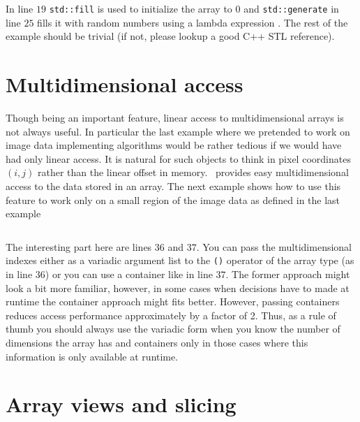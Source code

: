 \inputminted[fontsize=\small,
             linenos,
             firstline=24,
             frame=lines,
             label=examples/array\_stl.cpp]
{cpp}{../examples/array_stl.cpp}
In line $19$ \texttt{std::fill} is used to initialize the array to $0$ and 
\texttt{std::generate} in line $25$ fills it with random numbers using a lambda
expression . The rest of the example should be trivial (if not, please lookup a
good C++ STL reference).

\section{Multidimensional access}

Though being an important feature, linear access to multidimensional arrays is
not always useful. In particular the last example where we pretended to work on
image data implementing algorithms would be rather tedious if we would have had
only linear access. It is natural for such objects to think in pixel coordinates
$(i,j)$ rather than the linear offset in memory. 
\libpnicore\ provides easy multidimensional access to the data stored in an
array. The next example shows how to use this feature to work only on a small
region of the image data as defined in the last example
\inputminted[fontsize=\small,
             linenos,
             firstline=24,
             frame=lines,
             label=examples/array\_multiindex.cpp]
{cpp}{../examples/array_multiindex.cpp}
The interesting part here are lines $36$ and $37$. You can pass the
multidimensional indexes either as a variadic argument list to the  \texttt{()}
operator of the array type (as in line $36$) or you can use a container like 
in line $37$. The former approach might look a bit more familiar, however, in
some cases when decisions have to made at runtime the container approach might
fits better. However, passing containers reduces access performance
approximately by a factor of 2. Thus, as a rule of thumb you should always use
the variadic form when you know the number of dimensions the array has and
containers only in those cases where this information is only available at
runtime.

\section{Array views and slicing}

